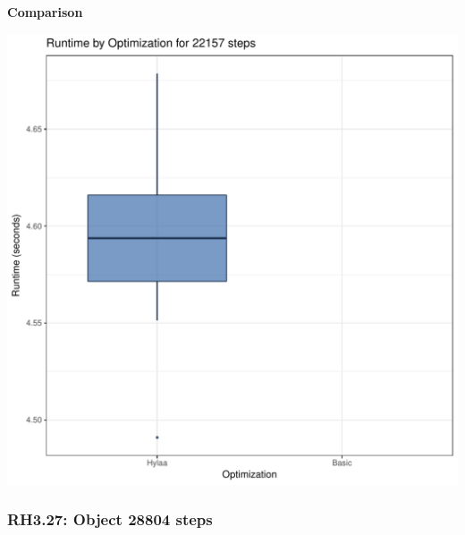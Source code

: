 \documentclass{article}\usepackage[]{graphicx}\usepackage[]{color}
\makeatletter
\def\maxwidth{ %
  \ifdim\Gin@nat@width>\linewidth
    \linewidth
  \else
    \Gin@nat@width
  \fi
}
\newenvironment{knitrout}{}{} %
\makeatother
\begin{document}
 \textbf{Comparison}
  
\begin{knitrout}
\color{fgcolor}
\includegraphics[width=\maxwidth]{figure/RH3_steps22157-1} 

\end{knitrout}


\subsubsection{RH3.27: Object 28804 steps}
\end{document}
